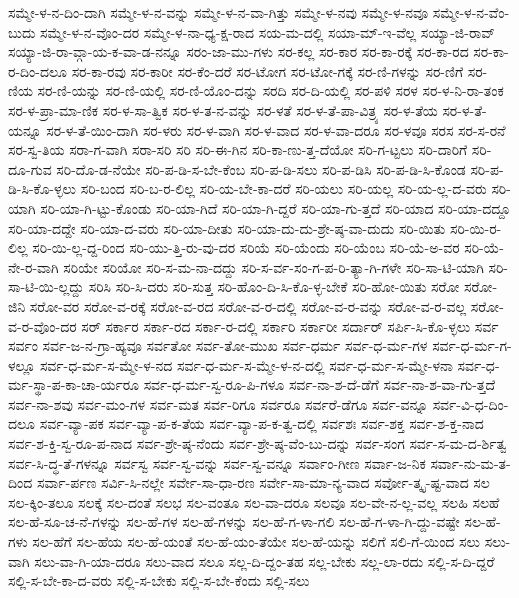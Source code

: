 {ಸಮ್ಮೇ-ಳ-ನ-ದಿಂ-ದಾಗಿ
ಸಮ್ಮೇ-ಳ-ನ-ವನ್ನು
ಸಮ್ಮೇ-ಳ-ನ-ವಾ-ಗಿತ್ತು
ಸಮ್ಮೇ-ಳ-ನವು
ಸಮ್ಮೇ-ಳ-ನವೂ
ಸಮ್ಮೇ-ಳ-ನ-ವೆಂ-ಬುದು
ಸಮ್ಮೇ-ಳ-ನ-ವೊಂ-ದರ
ಸಮ್ಮೇ-ಳ-ನಾ-ಧ್ಯ-ಕ್ಷ-ರಾದ
ಸಯ-ಮ-ದಲ್ಲಿ
ಸಯಾ-ಮ್-ಇ-ವೆಲ್ಲ
ಸಯ್ಯಾ-ಜಿ-ರಾವ್
ಸಯ್ಯಾ-ಜಿ-ರಾ-ವ್ಗಾ-ಯ-ಕ-ವಾ-ಡ-ನನ್ನೂ
ಸರಂ-ಜಾ-ಮು-ಗಳು
ಸರ-ಕಲ್ಲ
ಸರ-ಕಾರ
ಸರ-ಕಾ-ರಕ್ಕೆ
ಸರ-ಕಾ-ರದ
ಸರ-ಕಾ-ರ-ದಿಂ-ದಲೂ
ಸರ-ಕಾ-ರವು
ಸರ-ಕಾರೀ
ಸರ-ಕೆಂ-ದರೆ
ಸರ-ಟೋಗ
ಸರ-ಟೋ-ಗಕ್ಕೆ
ಸರ-ಣಿ-ಗಳನ್ನು
ಸರ-ಣಿಗೆ
ಸರ-ಣಿಯ
ಸರ-ಣಿ-ಯನ್ನು
ಸರ-ಣಿ-ಯಲ್ಲಿ
ಸರ-ಣಿ-ಯೊಂ-ದನ್ನು
ಸರದಿ
ಸರ-ದಿ-ಯಲ್ಲಿ
ಸರ-ಪಳಿ
ಸರಳ
ಸರ-ಳ-ನಿ-ರಾ-ತಂಕ
ಸರ-ಳ-ಪ್ರಾ-ಮಾ-ಣಿಕ
ಸರ-ಳ-ಸಾ-ತ್ವಿಕ
ಸರ-ಳ-ತ-ನ-ವನ್ನು
ಸರ-ಳತೆ
ಸರ-ಳ-ತೆ-ಪಾ-ವಿತ್ರ್ಯ
ಸರ-ಳ-ತೆಯ
ಸರ-ಳ-ತೆ-ಯನ್ನೂ
ಸರ-ಳ-ತೆ-ಯಿಂ-ದಾಗಿ
ಸರ-ಳರು
ಸರ-ಳ-ವಾಗಿ
ಸರ-ಳ-ವಾದ
ಸರ-ಳ-ವಾ-ದರೂ
ಸರ-ಳವೂ
ಸರಸ
ಸರ-ಸ-ರನೆ
ಸರ-ಸ್ವ-ತಿಯ
ಸರಾ-ಗ-ವಾಗಿ
ಸರಾ-ಸರಿ
ಸರಿ
ಸರಿ-ಈ-ಗಿನ
ಸರಿ-ಕಾ-ಣು-ತ್ತ-ದೆಯೋ
ಸರಿ-ಗ-ಟ್ಟಲು
ಸರಿ-ದಾರಿಗೆ
ಸರಿ-ದೂ-ಗುವ
ಸರಿ-ದೊ-ಡ-ನೆಯೇ
ಸರಿ-ಪ-ಡಿ-ಸ-ಬೇ-ಕೆಂಬ
ಸರಿ-ಪ-ಡಿ-ಸಲು
ಸರಿ-ಪ-ಡಿಸಿ
ಸರಿ-ಪ-ಡಿ-ಸಿ-ಕೊಂಡ
ಸರಿ-ಪ-ಡಿ-ಸಿ-ಕೊ-ಳ್ಳಲು
ಸರಿ-ಬಂದ
ಸರಿ-ಬ-ರ-ಲಿಲ್ಲ
ಸರಿ-ಯ-ಬೇ-ಕಾ-ದರೆ
ಸರಿ-ಯಲು
ಸರಿ-ಯಲ್ಲ
ಸರಿ-ಯ-ಲ್ಲ-ದ-ವರು
ಸರಿ-ಯಾಗಿ
ಸರಿ-ಯಾ-ಗಿ-ಟ್ಟು-ಕೊಂಡು
ಸರಿ-ಯಾ-ಗಿದೆ
ಸರಿ-ಯಾ-ಗಿ-ದ್ದರೆ
ಸರಿ-ಯಾ-ಗು-ತ್ತದೆ
ಸರಿ-ಯಾದ
ಸರಿ-ಯಾ-ದದ್ದೂ
ಸರಿ-ಯಾ-ದದ್ದೇ
ಸರಿ-ಯಾ-ದ-ವರು
ಸರಿ-ಯಾ-ದೀತು
ಸರಿ-ಯಾ-ದು-ದು-ಶ್ರೇ-ಷ್ಠ-ವಾ-ದುದು
ಸರಿ-ಯಿತು
ಸರಿ-ಯಿ-ರ-ಲಿಲ್ಲ
ಸರಿ-ಯಿ-ಲ್ಲ-ದ್ದ-ರಿಂದ
ಸರಿ-ಯು-ತ್ತಿ-ರು-ವು-ದರ
ಸರಿಯೆ
ಸರಿ-ಯೆಂದು
ಸರಿ-ಯೆಂಬ
ಸರಿ-ಯೆ-ಅ-ವರ
ಸರಿ-ಯೆ-ನೇ-ರ-ವಾಗಿ
ಸರಿಯೇ
ಸರಿಯೋ
ಸರಿ-ಸ-ಮ-ನಾ-ದದ್ದು
ಸರಿ-ಸ-ರ್ವ-ಸಂ-ಗ-ಪ-ರಿ-ತ್ಯಾ-ಗಿ-ಗಳೇ
ಸರಿ-ಸಾ-ಟಿ-ಯಾಗಿ
ಸರಿ-ಸಾ-ಟಿ-ಯಿ-ಲ್ಲದ್ದು
ಸರಿಸಿ
ಸರಿ-ಸಿ-ದರು
ಸರಿ-ಸುತ್ತ
ಸರಿ-ಹೊಂ-ದಿ-ಸಿ-ಕೊ-ಳ್ಳ-ಬೇಕೆ
ಸರಿ-ಹೋ-ಯಿತು
ಸರೋ
ಸರೋ-ಜಿನಿ
ಸರೋ-ವರ
ಸರೋ-ವ-ರಕ್ಕೆ
ಸರೋ-ವ-ರದ
ಸರೋ-ವ-ರ-ದಲ್ಲಿ
ಸರೋ-ವ-ರ-ವನ್ನು
ಸರೋ-ವ-ರ-ವಲ್ಲ
ಸರೋ-ವ-ರ-ವೊಂ-ದರ
ಸರ್
ಸರ್ಕಾರ
ಸರ್ಕಾ-ರದ
ಸರ್ಕಾ-ರ-ದಲ್ಲಿ
ಸರ್ಕಾರಿ
ಸರ್ಕಾರೀ
ಸರ್ದಾರ್
ಸರ್ಪಿ-ಸಿ-ಕೊ-ಳ್ಳಲು
ಸರ್ವ
ಸರ್ವಂ
ಸರ್ವ-ಜ-ನ-ಗ್ರಾ-ಹ್ಯವೂ
ಸರ್ವತೋ
ಸರ್ವ-ತೋ-ಮುಖ
ಸರ್ವ-ಧರ್ಮ
ಸರ್ವ-ಧ-ರ್ಮ-ಗಳ
ಸರ್ವ-ಧ-ರ್ಮ-ಗ-ಳಲ್ಲೂ
ಸರ್ವ-ಧ-ರ್ಮ-ಸ-ಮ್ಮೇ-ಳ-ನದ
ಸರ್ವ-ಧ-ರ್ಮ-ಸ-ಮ್ಮೇ-ಳ-ನ-ದಲ್ಲಿ
ಸರ್ವ-ಧ-ರ್ಮ-ಸ-ಮ್ಮೇ-ಳನಾ
ಸರ್ವ-ಧ-ರ್ಮ-ಸ್ಥಾ-ಪ-ಕಾ-ಚಾ-ರ್ಯರೂ
ಸರ್ವ-ಧ-ರ್ಮ-ಸ್ವ-ರೂ-ಪಿ-ಗಳೂ
ಸರ್ವ-ನಾ-ಶ-ದೆ-ಡೆಗೆ
ಸರ್ವ-ನಾ-ಶ-ವಾ-ಗು-ತ್ತದೆ
ಸರ್ವ-ನಾ-ಶವು
ಸರ್ವ-ಮಂ-ಗಳ
ಸರ್ವ-ಮತ
ಸರ್ವ-ರಿಗೂ
ಸರ್ವರೂ
ಸರ್ವರೆ-ಡೆಗೂ
ಸರ್ವ-ವನ್ನೂ
ಸರ್ವ-ವಿ-ಧ-ದಿಂ-ದಲೂ
ಸರ್ವ-ವ್ಯಾ-ಪಕ
ಸರ್ವ-ವ್ಯಾ-ಪ-ಕ-ತೆಯ
ಸರ್ವ-ವ್ಯಾ-ಪ-ಕ-ತ್ವ-ದಲ್ಲಿ
ಸರ್ವಶಃ
ಸರ್ವ-ಶಕ್ತ
ಸರ್ವ-ಶ-ಕ್ತ-ನಾದ
ಸರ್ವ-ಶ-ಕ್ತಿ-ಸ್ವ-ರೂ-ಪ-ನಾದ
ಸರ್ವ-ಶ್ರೇ-ಷ್ಠ-ನೆಂದು
ಸರ್ವ-ಶ್ರೇ-ಷ್ಠ-ವೆಂ-ಬು-ದನ್ನು
ಸರ್ವ-ಸಂಗ
ಸರ್ವ-ಸ-ಮ-ದ-ರ್ಶಿತ್ವ
ಸರ್ವ-ಸಿ-ದ್ಧ-ತೆ-ಗಳನ್ನೂ
ಸರ್ವಸ್ವ
ಸರ್ವ-ಸ್ವ-ವನ್ನು
ಸರ್ವ-ಸ್ವ-ವನ್ನೂ
ಸರ್ವಾಂ-ಗೀಣ
ಸರ್ವಾ-ಜ-ನಿಕ
ಸರ್ವಾ-ನು-ಮ-ತ-ದಿಂದ
ಸರ್ವಾ-ರ್ಪಣ
ಸರ್ವಿ-ಸಿ-ನಲ್ಲೇ
ಸರ್ವೇ-ಸಾ-ಧಾ-ರಣ
ಸರ್ವೇ-ಸಾ-ಮಾ-ನ್ಯ-ವಾದ
ಸರ್ವೋ-ತ್ಕೃ-ಷ್ಟ-ವಾದ
ಸಲ
ಸಲ-ಕ್ಕಿಂ-ತಲೂ
ಸಲಕ್ಕೆ
ಸಲ-ದಂತೆ
ಸಲಭ
ಸಲ-ವಂತೂ
ಸಲ-ವಾ-ದರೂ
ಸಲವೂ
ಸಲ-ವೇ-ನ-ಲ್ಲ-ವಲ್ಲ
ಸಲಹಿ
ಸಲಹೆ
ಸಲ-ಹೆ-ಸೂ-ಚ-ನೆ-ಗಳನ್ನು
ಸಲ-ಹೆ-ಗಳ
ಸಲ-ಹೆ-ಗಳನ್ನು
ಸಲ-ಹೆ-ಗ-ಳಾ-ಗಲಿ
ಸಲ-ಹೆ-ಗ-ಳಾ-ಗಿ-ದ್ದು-ವಷ್ಟೇ
ಸಲ-ಹೆ-ಗಳು
ಸಲ-ಹೆಗೆ
ಸಲ-ಹೆಯ
ಸಲ-ಹೆ-ಯಂತೆ
ಸಲ-ಹೆ-ಯಂ-ತೆಯೇ
ಸಲ-ಹೆ-ಯನ್ನು
ಸಲಿಗೆ
ಸಲಿ-ಗೆ-ಯಿಂದ
ಸಲು
ಸಲು-ವಾಗಿ
ಸಲು-ವಾ-ಗಿ-ಯಾ-ದರೂ
ಸಲು-ವಾದ
ಸಲೂ
ಸಲ್ಲ-ದಿ-ದ್ದಂ-ತಹ
ಸಲ್ಲ-ಬೇಕು
ಸಲ್ಲ-ಲಾ-ರದು
ಸಲ್ಲಿ-ಸ-ದಿ-ದ್ದರೆ
ಸಲ್ಲಿ-ಸ-ಬೇ-ಕಾ-ದ-ವರು
ಸಲ್ಲಿ-ಸ-ಬೇಕು
ಸಲ್ಲಿ-ಸ-ಬೇ-ಕೆಂದು
ಸಲ್ಲಿ-ಸಲು
}
